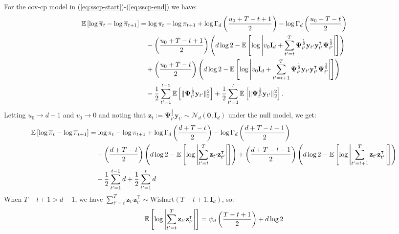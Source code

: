 For the cov-cp model in (\ref{eq:sscp-start})-(\ref{eq:sscp-end}) we have:
\small
\begin{align*}
    \mathbb{E}\left[\log\overline{\pi}_t - \log \overline{\pi}_{t+1} \right] &= \log \pi_t- \log \pi_{t+1} +\log \Gamma_d\left(\frac{u_0 + T-t+1}{2}\right) - \log \Gamma_d\left(\frac{u_0 + T-t}{2}\right) \\
    &\quad - \left(\frac{u_0 + T - t+1}{2}\right)\left(d\log 2 - \mathbb{E}\left[\log \left|v_0\mathbf{I}_d +  \sum_{t'=t}^{T} \boldsymbol{\Psi}^{\frac{1}{2}}_{t'}\mathbf{y}_{t'}\mathbf{y}^\intercal_{t'}\boldsymbol{\Psi}^{\frac{1}{2}}_{t'}\right| \right]\right) \\
    &\quad + \left(\frac{u_0 + T - t}{2}\right)\left(d\log 2 - \mathbb{E}\left[\log \left|v_0\mathbf{I}_d +  \sum_{t'=t+1}^{T} \boldsymbol{\Psi}^{\frac{1}{2}}_{t'}\mathbf{y}_{t'}\mathbf{y}^\intercal_{t'}\boldsymbol{\Psi}^{\frac{1}{2}}_{t'}\right| \right]\right) \\
    &\quad- \frac{1}{2}\sum_{t'=1}^{t-1} \mathbb{E}\left[\lVert\boldsymbol{\Psi}_{t'}^{\frac{1}{2}}\mathbf{y}_{t'}\rVert_2^2 \right] + \frac{1}{2}\sum_{t'=1}^{t} \mathbb{E}\left[\lVert\boldsymbol{\Psi}_{t'}^{\frac{1}{2}}\mathbf{y}_{t'}\rVert_2^2 \right].
\end{align*}
\normalsize
Letting $u_0 \to d-1$ and $v_0 \to 0$ and noting that $\mathbf{z}_{t} := \boldsymbol{\Psi}^{\frac{1}{2}}_{t'}\mathbf{y}_{t'} \sim \mathcal{N}_d\left(\mathbf{0}, \mathbf{I}_d\right)$ under the null model, we get:
\small
\begin{align*}
    \mathbb{E}\left[\log\overline{\pi}_t - \log \overline{\pi}_{t+1} \right] &= \log \pi_t- \log \pi_{t+1} +\log \Gamma_d\left(\frac{d + T-t}{2}\right) - \log \Gamma_d\left(\frac{d + T-t - 1}{2}\right) \\
    &\quad - \left(\frac{d+ T - t}{2}\right)\left(d\log 2 - \mathbb{E}\left[\log \left|\sum_{t'=t}^{T} \mathbf{z}_{t'}\mathbf{z}^\intercal_{t'}\right| \right]\right) + \left(\frac{d + T - t-1}{2}\right)\left(d\log 2 - \mathbb{E}\left[\log \left|\sum_{t'=t+1}^{T} \mathbf{z}_{t'}\mathbf{z}^\intercal_{t'}\right| \right]\right) \\
    &\quad- \frac{1}{2}\sum_{t'=1}^{t-1} d + \frac{1}{2}\sum_{t'=1}^{t} d
\end{align*}
\normalsize
When $T - t+ 1 > d - 1$, we have $\sum_{t'=t}^{T} \mathbf{z}_{t'}\mathbf{z}^\intercal_{t'} \sim \text{Wishart}(T-t+1, \mathbf{I}_d)$, so:
\begin{align*}
    \mathbb{E}\left[\log \left|\sum_{t'=t}^{T} \mathbf{z}_{t'}\mathbf{z}^\intercal_{t'}\right| \right] = \psi_d\left(\frac{T-t+1}{2}\right) + d\log 2
\end{align*}
